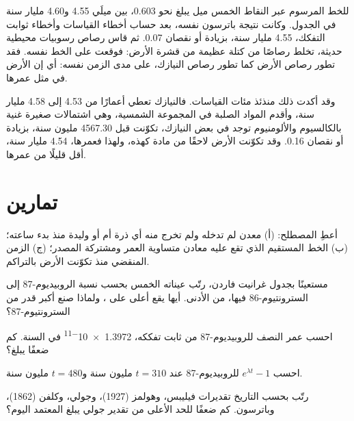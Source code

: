 للخط المرسوم عبر النقاط الخمس ميل يبلغ نحو 0.603، بين
ميلَي 4.55 و4.60 مليار سنة في الجدول. وكانت نتيجة باترسون
نفسه، بعد حساب أخطاء القياسات وأخطاء ثوابت
التفكك، 4.55 مليار سنة، بزيادة أو نقصان 0.07. ثم قاس رصاص رسوبيات محيطية حديثة، تخلط
رصاصًا من كتلة عظيمة من قشرة الأرض: فوقعت على الخط نفسه. فقد
تطور رصاص الأرض كما تطور رصاص النيازك، على مدى الزمن نفسه: أي إن
الأرض في مثل عمرها.

وقد أكدت ذلك منذئذ مئات القياسات. فالنيازك تعطي أعمارًا
من 4.53 إلى 4.58 مليار سنة، وأقدم المواد الصلبة في المجموعة الشمسية،
وهي اشتمالات صغيرة غنية بالكالسيوم والألومنيوم توجد في بعض النيازك،
تكوّنت قبل \num{4567.30} مليون سنة، بزيادة أو نقصان 0.16. وقد تكوّنت الأرض
لاحقًا من مادة كهذه، ولهذا فعمرها، 4.54 مليار سنة، أقل
قليلًا من عمرها.

\section{تمارين}

\begin{exercise}[$\star$]\label{exo:g12:age-of-the-earth:1}
أعطِ المصطلح: (أ) معدن لم تدخله ولم تخرج منه أي ذرة أم أو وليدة
منذ بدء ساعته؛ (ب) الخط المستقيم الذي تقع عليه معادن
متساوية العمر ومشتركة المصدر؛ (ج) الزمن المنقضي منذ تكوّنت الأرض
بالتراكم.
\end{exercise}

\begin{exercise}[$\star$]\label{exo:g12:age-of-the-earth:2}
مستعينًا بجدول غرانيت فاردن، رتّب عيناته الخمس بحسب
نسبة الروبيديوم-87 إلى السترونتيوم-86 فيها، من الأدنى. أيها يقع
أعلى على ، ولماذا صنع أكبر قدر من السترونتيوم-87؟
\end{exercise}

\begin{exercise}[$\star$]\label{exo:g12:age-of-the-earth:3}
احسب عمر النصف للروبيديوم-87 من ثابت تفككه،
\num{1.3972e-11} في السنة. كم ضعفًا  يبلغ؟
\end{exercise}

\begin{exercise}[$\star$]\label{exo:g12:age-of-the-earth:4}
احسب $e^{\lambda t} - 1$ للروبيديوم-87 عند $t = 310$ مليون سنة
و$t = 480$ مليون سنة.
\end{exercise}

\begin{exercise}[$\star$]\label{exo:g12:age-of-the-earth:5}
رتّب بحسب التاريخ تقديرات فيليبس، وهولمز (1927)، وجولي، وكلفن
(1862)، وباترسون. كم ضعفًا للحد الأعلى من تقدير جولي
يبلغ  المعتمد اليوم؟
\end{exercise}

